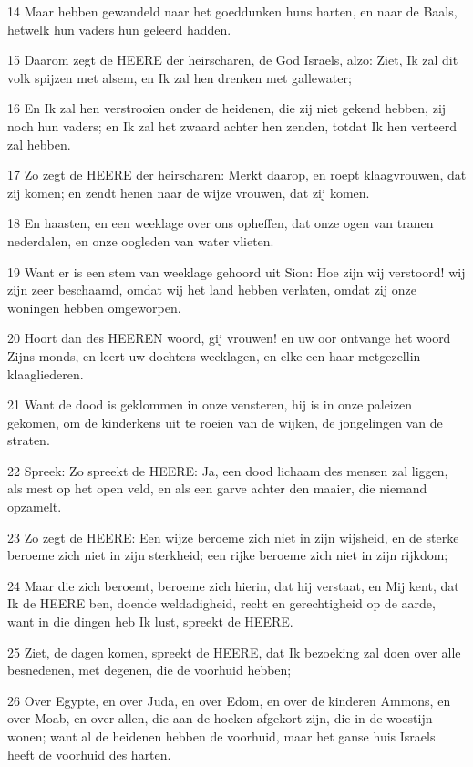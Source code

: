 \par 14 Maar hebben gewandeld naar het goeddunken huns harten, en naar de Baals, hetwelk hun vaders hun geleerd hadden.
\par 15 Daarom zegt de HEERE der heirscharen, de God Israels, alzo: Ziet, Ik zal dit volk spijzen met alsem, en Ik zal hen drenken met gallewater;
\par 16 En Ik zal hen verstrooien onder de heidenen, die zij niet gekend hebben, zij noch hun vaders; en Ik zal het zwaard achter hen zenden, totdat Ik hen verteerd zal hebben.
\par 17 Zo zegt de HEERE der heirscharen: Merkt daarop, en roept klaagvrouwen, dat zij komen; en zendt henen naar de wijze vrouwen, dat zij komen.
\par 18 En haasten, en een weeklage over ons opheffen, dat onze ogen van tranen nederdalen, en onze oogleden van water vlieten.
\par 19 Want er is een stem van weeklage gehoord uit Sion: Hoe zijn wij verstoord! wij zijn zeer beschaamd, omdat wij het land hebben verlaten, omdat zij onze woningen hebben omgeworpen.
\par 20 Hoort dan des HEEREN woord, gij vrouwen! en uw oor ontvange het woord Zijns monds, en leert uw dochters weeklagen, en elke een haar metgezellin klaagliederen.
\par 21 Want de dood is geklommen in onze vensteren, hij is in onze paleizen gekomen, om de kinderkens uit te roeien van de wijken, de jongelingen van de straten.
\par 22 Spreek: Zo spreekt de HEERE: Ja, een dood lichaam des mensen zal liggen, als mest op het open veld, en als een garve achter den maaier, die niemand opzamelt.
\par 23 Zo zegt de HEERE: Een wijze beroeme zich niet in zijn wijsheid, en de sterke beroeme zich niet in zijn sterkheid; een rijke beroeme zich niet in zijn rijkdom;
\par 24 Maar die zich beroemt, beroeme zich hierin, dat hij verstaat, en Mij kent, dat Ik de HEERE ben, doende weldadigheid, recht en gerechtigheid op de aarde, want in die dingen heb Ik lust, spreekt de HEERE.
\par 25 Ziet, de dagen komen, spreekt de HEERE, dat Ik bezoeking zal doen over alle besnedenen, met degenen, die de voorhuid hebben;
\par 26 Over Egypte, en over Juda, en over Edom, en over de kinderen Ammons, en over Moab, en over allen, die aan de hoeken afgekort zijn, die in de woestijn wonen; want al de heidenen hebben de voorhuid, maar het ganse huis Israels heeft de voorhuid des harten.

